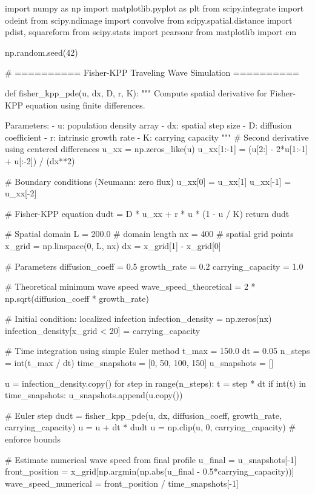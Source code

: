 \documentclass[a4paper, 11pt]{article}
\begin{document}
\begin{pycode}
import numpy as np
import matplotlib.pyplot as plt
from scipy.integrate import odeint
from scipy.ndimage import convolve
from scipy.spatial.distance import pdist, squareform
from scipy.stats import pearsonr
from matplotlib import cm

np.random.seed(42)

# ========== Fisher-KPP Traveling Wave Simulation ==========

def fisher_kpp_pde(u, dx, D, r, K):
    """
    Compute spatial derivative for Fisher-KPP equation using finite differences.

    Parameters:
    - u: population density array
    - dx: spatial step size
    - D: diffusion coefficient
    - r: intrinsic growth rate
    - K: carrying capacity
    """
    # Second derivative using centered differences
    u_xx = np.zeros_like(u)
    u_xx[1:-1] = (u[2:] - 2*u[1:-1] + u[:-2]) / (dx**2)

    # Boundary conditions (Neumann: zero flux)
    u_xx[0] = u_xx[1]
    u_xx[-1] = u_xx[-2]

    # Fisher-KPP equation
    dudt = D * u_xx + r * u * (1 - u / K)
    return dudt

# Spatial domain
L = 200.0  # domain length
nx = 400   # spatial grid points
x_grid = np.linspace(0, L, nx)
dx = x_grid[1] - x_grid[0]

# Parameters
diffusion_coeff = 0.5
growth_rate = 0.2
carrying_capacity = 1.0

# Theoretical minimum wave speed
wave_speed_theoretical = 2 * np.sqrt(diffusion_coeff * growth_rate)

# Initial condition: localized infection
infection_density = np.zeros(nx)
infection_density[x_grid < 20] = carrying_capacity

# Time integration using simple Euler method
t_max = 150.0
dt = 0.05
n_steps = int(t_max / dt)
time_snapshots = [0, 50, 100, 150]
u_snapshots = []

u = infection_density.copy()
for step in range(n_steps):
    t = step * dt
    if int(t) in time_snapshots:
        u_snapshots.append(u.copy())

    # Euler step
    dudt = fisher_kpp_pde(u, dx, diffusion_coeff, growth_rate, carrying_capacity)
    u = u + dt * dudt
    u = np.clip(u, 0, carrying_capacity)  # enforce bounds

# Estimate numerical wave speed from final profile
u_final = u_snapshots[-1]
front_position = x_grid[np.argmin(np.abs(u_final - 0.5*carrying_capacity))]
wave_speed_numerical = front_position / time_snapshots[-1]


\end{pycode}
\end{document}

